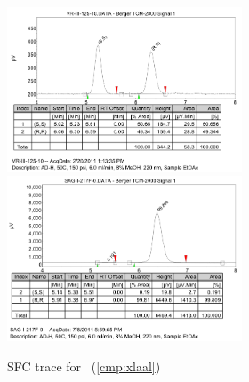 \begin{figure}[h]
\centering
\includegraphics[width=2.75in]{chp_asymmetric/images/sfc/xlaal-rac.png}
\includegraphics[width=2.75in]{chp_asymmetric/images/sfc/xlaal.png}
\caption{SFC trace for \CMPxlaal~(\ref{cmp:xlaal})}
\vspace{-10pt}
\end{figure}

